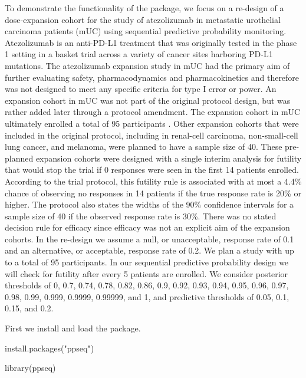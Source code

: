 To demonstrate the functionality of the  package, we focus on
a re-design of a dose-expansion cohort for the study of atezolizumab in
metastatic urothelial carcinoma patients (mUC) using sequential
predictive probability monitoring. Atezolizumab is an anti-PD-L1
treatment that was originally tested in the phase 1 setting in a basket
trial across a variety of cancer sites harboring PD-L1 mutations. The
atezolizumab expansion study in mUC had the primary aim of further
evaluating safety, pharmacodynamics and pharmacokinetics and therefore
was not designed to meet any specific criteria for type I error or
power. An expansion cohort in mUC was not part of the original protocol
design, but was rather added later through a protocol amendment. The
expansion cohort in mUC ultimately enrolled a total of 95 participants
\citep{Powles2014}. Other expansion cohorts that were included in the
original protocol, including in renal-cell carcinoma, non-small-cell
lung cancer, and melanoma, were planned to have a sample size of 40.
These pre-planned expansion cohorts were designed with a single interim
analysis for futility that would stop the trial if 0 responses were seen
in the first 14 patients enrolled. According to the trial protocol, this
futility rule is associated with at most a 4.4\% chance of observing no
responses in 14 patients if the true response rate is 20\% or higher.
The protocol also states the widths of the 90\% confidence intervals for
a sample size of 40 if the observed response rate is 30\%. There was no
stated decision rule for efficacy since efficacy was not an explicit aim
of the expansion cohorts. In the re-design we assume a null, or
unacceptable, response rate of 0.1 and an alternative, or acceptable,
response rate of 0.2. We plan a study with up to a total of 95
participants. In our sequential predictive probability design we will
check for futility after every 5 patients are enrolled. We consider
posterior thresholds of 0, 0.7, 0.74, 0.78, 0.82, 0.86, 0.9, 0.92, 0.93,
0.94, 0.95, 0.96, 0.97, 0.98, 0.99, 0.999, 0.9999, 0.99999, and 1, and
predictive thresholds of 0.05, 0.1, 0.15, and 0.2.

First we install and load the  package.

\begin{Schunk}
\begin{Sinput}
install.packages("ppseq")
\end{Sinput}
\end{Schunk}

\begin{Schunk}
\begin{Sinput}
library(ppseq)
\end{Sinput}
\end{Schunk}

